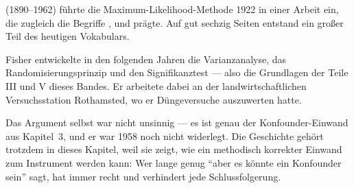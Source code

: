 \begin{geschichte}
 (1890--1962) führte die Maximum-Likelihood-Methode 1922 in einer Arbeit ein, die zugleich die Begriffe ,  und  prägte. Auf gut sechzig Seiten entstand ein großer Teil des heutigen Vokabulars.

Fisher entwickelte in den folgenden Jahren die Varianzanalyse, das Randomisierungsprinzip und den Signifikanztest --- also die Grundlagen der Teile III und V dieses Bandes. Er arbeitete dabei an der landwirtschaftlichen Versuchsstation Rothamsted, wo er Düngeversuche auszuwerten hatte.

\begin{center}
\begin{minipage}{0.9\textwidth}
\end{minipage}
\end{center}

Das Argument selbst war nicht unsinnig --- es ist genau der Konfounder-Einwand aus Kapitel~3, und er war 1958 noch nicht widerlegt. Die Geschichte gehört trotzdem in dieses Kapitel, weil sie zeigt, wie ein methodisch korrekter Einwand zum Instrument werden kann: Wer lange genug \enquote{aber es könnte ein Konfounder sein} sagt, hat immer recht und verhindert jede Schlussfolgerung.

\begin{center}
\begin{minipage}{0.9\textwidth}
\end{minipage}
\end{center}
\end{geschichte}

